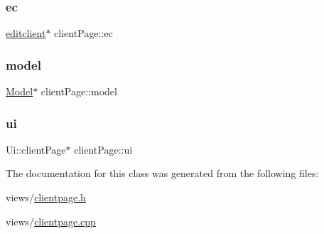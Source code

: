 \subsubsection{\texorpdfstring{ec}{ec}}
{\footnotesize\ttfamily \hyperlink{classeditclient}{editclient}$\ast$ client\+Page\+::ec\hspace{0.3cm}{\ttfamily [private]}}

\mbox{\label{classclientPage_a21b8604c7b8285a3ba9c37b133f89f02}} 
\subsubsection{\texorpdfstring{model}{model}}
{\footnotesize\ttfamily \hyperlink{classModel}{Model}$\ast$ client\+Page\+::model\hspace{0.3cm}{\ttfamily [private]}}

\mbox{\label{classclientPage_a1c0ad34f6a6dc4eb84713d0c770ee27a}} 
\subsubsection{\texorpdfstring{ui}{ui}}
{\footnotesize\ttfamily Ui\+::client\+Page$\ast$ client\+Page\+::ui\hspace{0.3cm}{\ttfamily [private]}}



The documentation for this class was generated from the following files\+:\begin{DoxyCompactItemize}
\item 
views/\hyperlink{clientpage_8h}{clientpage.\+h}\item 
views/\hyperlink{clientpage_8cpp}{clientpage.\+cpp}\end{DoxyCompactItemize}

